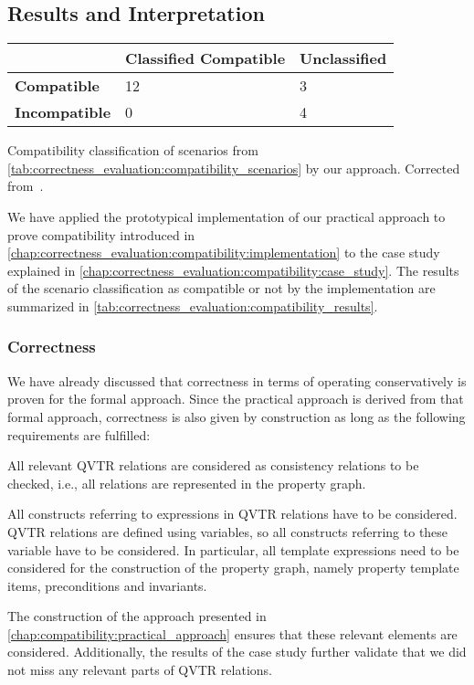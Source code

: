 \subsection{Results and Interpretation}

\begin{propertable}
    \renewcommand{\arraystretch}{1.2}%
    \begin{tabular}{L{7em} C{10em} C{6em}}
        \toprule
         & \textbf{Classified Compatible} & \textbf{Unclassified} \\
         \midrule
         \textbf{Compatible} & 12 & 3\\
         \textbf{Incompatible} & 0 & 4\\
         \bottomrule
    \end{tabular}
    \caption[Correctness of compatibility classification results]{Compatibility classification of scenarios from \autoref{tab:correctness_evaluation:compatibility_scenarios} by our approach. Corrected from~.}
    \label{tab:correctness_evaluation:compatibility_results}
\end{propertable}

We have applied the prototypical implementation of our practical approach to prove compatibility introduced in \autoref{chap:correctness_evaluation:compatibility:implementation} to the case study explained in \autoref{chap:correctness_evaluation:compatibility:case_study}.
The results of the scenario classification as compatible or not by the implementation are summarized in \autoref{tab:correctness_evaluation:compatibility_results}.


\subsubsection{Correctness}

We have already discussed that correctness in terms of operating conservatively is proven for the formal approach.
Since the practical approach is derived from that formal approach, correctness is also given by construction as long as the following requirements are fulfilled:
\begin{longenumerate}
    \item All relevant \gls{QVTR} relations are considered as consistency relations to be checked, i.e., all relations are represented in the property graph.
    \item All constructs referring to expressions in \gls{QVTR} relations have to be considered. \gls{QVTR} relations are defined using variables, so all constructs referring to these variable have to be considered. In particular, all template expressions need to be considered for the construction of the property graph, namely property template items, preconditions and invariants.
\end{longenumerate}
The construction of the approach presented in \autoref{chap:compatibility:practical_approach} ensures that these relevant elements are considered.
Additionally, the results of the case study further validate that we did not miss any relevant parts of \gls{QVTR} relations.

